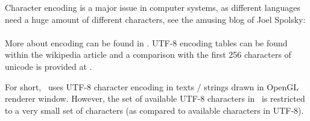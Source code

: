 Character encoding is a major issue in computer systems, as different languages need a huge amount of different characters,
see the amusing blog of Joel Spolsky:\\
\\
More about encoding can be found in . UTF-8 encoding tables can be found within the wikipedia article and a comparison with the first 256 characters of unicode is provided at .


For short, \codeName\ uses UTF-8 character encoding in texts / strings drawn in OpenGL renderer window.
However, the set of available UTF-8 characters in \codeName\ is restricted to a very small set of characters (as compared to available characters in UTF-8).

